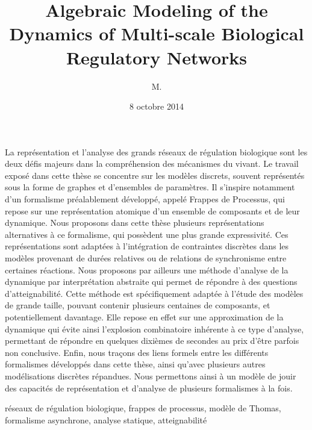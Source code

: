 \documentclass[12pt,french,francais,nofancyChapter,nofancyPart]{these-LUNAM}
\title{Algebraic Modeling of the Dynamics of Multi-scale
  Biological Regulatory Networks}
\author{M.}{Maxime}{Folschette}
\date{8 octobre 2014}
\theoremstyle{definition}
\theoremstyle{remark}
\begin{document}
\begin{resume}
  \scriptsize
  La représentation et l'analyse des grands réseaux de régulation biologique
  sont les deux défis majeurs dans la compréhension des mécanismes du vivant.
  Le travail exposé dans cette thèse se concentre sur les modèles discrets,
  souvent représentés sous la forme de graphes et d'ensembles de paramètres.
  Il s'inspire notamment d'un formalisme préalablement développé,
  appelé Frappes de Processus,
  qui repose sur une représentation atomique d'un ensemble de composants et de leur dynamique.
  Nous proposons dans cette thèse plusieurs représentations alternatives à
  ce formalisme, qui possèdent une plus grande expressivité.
  Ces représentations sont adaptées à l'intégration
  de contraintes discrètes dans les modèles
  provenant de durées relatives ou de relations de synchronisme entre certaines réactions.
  Nous proposons par ailleurs
  une méthode d'analyse de la dynamique par interprétation abstraite
  qui permet de répondre à des questions d'atteignabilité.
  Cette méthode est spécifiquement adaptée à l'étude des modèles de grande taille,
  pouvant contenir plusieurs centaines de composants, et potentiellement davantage.
  Elle repose en effet sur une approximation de la dynamique qui évite ainsi
  l'explosion combinatoire inhérente à ce type d'analyse,
  permettant de répondre en quelques dixièmes de secondes au prix d'être parfois non conclusive.
  Enfin, nous traçons des liens formels entre
  les différents formalismes développés dans cette
  thèse, ainsi qu'avec plusieurs autres modélisations discrètes répandues.
  Nous permettons ainsi à un modèle de jouir des capacités de représentation et d'analyse
  de plusieurs formalismes à la fois.
\end{resume}

\begin{motscles}
  réseaux de régulation biologique,
  frappes de processus,
  modèle de Thomas,
  formalisme asynchrone,
  analyse statique,
  atteignabilité
\end{motscles}
\end{document}
